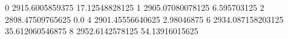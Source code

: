 0 2915.6005859375 17.12548828125
1 2905.07080078125 6.595703125
2 2898.47509765625 0.0
4 2901.45556640625 2.98046875
6 2934.087158203125 35.612060546875
8 2952.6142578125 54.13916015625
